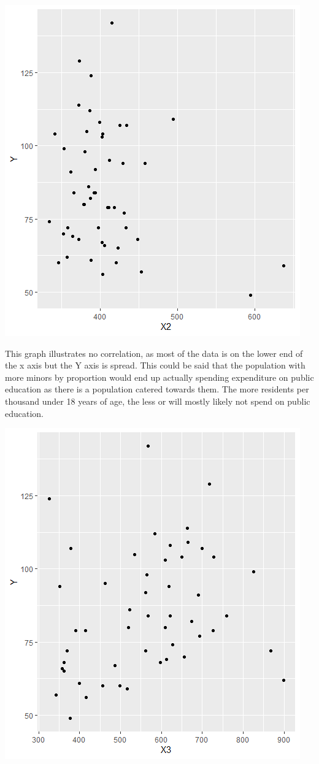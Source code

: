 \documentclass[12pt,letterpaper]{article}
\begin{document}
\begin{itemize}
\includegraphics{Y vs X2}

This graph illustrates no correlation, as most of the data is on the lower end of the x axis but the Y axis is spread. This could be said that the population with more minors by proportion would end up actually spending expenditure on public education as there is a population catered towards them. The more residents per thousand under 18 years of age, the less or will mostly likely not spend on public education. 



\includegraphics{Y vs X3}


\end{itemize}
\end{document}
